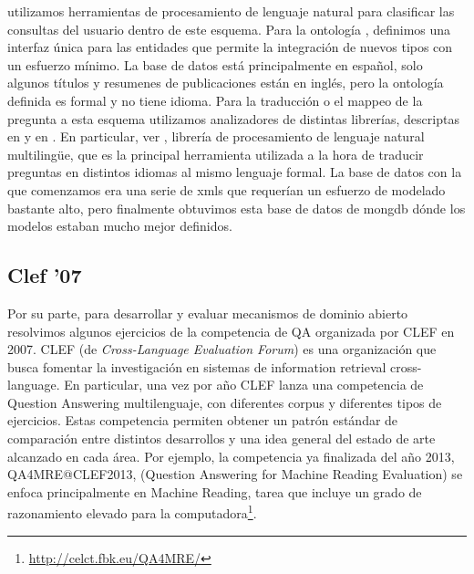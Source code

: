 utilizamos herramientas de procesamiento de lenguaje natural para
clasificar las consultas del usuario dentro de este esquema. Para la
ontología , definimos una interfaz única para las entidades que
permite la integración de nuevos tipos con un esfuerzo mínimo. 
La base de datos está principalmente en español, solo algunos títulos y resumenes de publicaciones están en inglés,
pero la ontología definida es formal y no tiene idioma. 
Para la traducción o el mappeo de la pregunta a esta esquema utilizamos 
analizadores de distintas librerías, descriptas en  y en .
En particular, ver , librería de procesamiento de lenguaje natural multilingüe, que
es la principal herramienta utilizada a la hora de traducir preguntas en distintos idiomas al mismo lenguaje formal.
La base de datos con la que comenzamos era una serie de xmls que requerían un esfuerzo de modelado bastante alto,
pero finalmente obtuvimos esta base de datos de mongdb dónde los modelos estaban mucho mejor definidos.

\subsection{Clef '07}
\label{subsec:clef07}
\horrible
Por su parte, para desarrollar y evaluar mecanismos de dominio abierto resolvimos algunos ejercicios de la competencia de QA organizada por CLEF 
en 2007. 
CLEF (de \textit{Cross-Language Evaluation Forum}) es una organización que busca fomentar la investigación en sistemas de information retrieval cross-language. 
En particular, una vez por año CLEF lanza una competencia de Question Answering multilenguaje, con diferentes corpus y diferentes tipos de ejercicios. Estas competencia permiten obtener un patrón estándar de comparación entre distintos desarrollos y una idea general del estado de arte alcanzado en cada área.
Por ejemplo, la competencia ya finalizada del año 2013, QA4MRE@CLEF2013, (Question Answering for Machine Reading Evaluation) se enfoca principalmente en Machine Reading, tarea que incluye un grado de razonamiento elevado para la computadora\footnote{\url{http://celct.fbk.eu/QA4MRE/}}.

